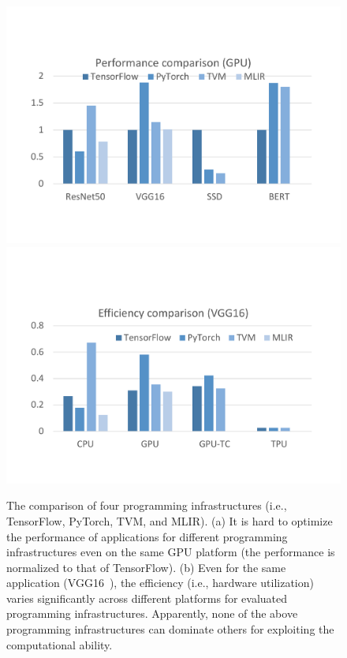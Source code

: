 \documentclass[pageno]{jpaper}
\begin{document}
\begin{figure}[t]

\centering
  \includegraphics[width=0.44\columnwidth]{figures/intro-perf-gpu.pdf}
  \includegraphics[width=0.44\columnwidth]{figures/intro-eff.pdf}
\caption{\footnotesize The comparison of four programming infrastructures (i.e., TensorFlow, PyTorch, TVM, and MLIR). (a) It is hard to optimize the performance of applications for different programming infrastructures even on the same GPU platform (the performance is normalized to that of TensorFlow). (b) Even for the same application (VGG16~\cite{simonyan2014very}), the efficiency (i.e., hardware utilization) varies significantly across different platforms for evaluated programming infrastructures. Apparently, none of the above programming infrastructures can dominate others for exploiting the computational ability.}
\label{fig:challenge}

\end{figure}
\end{document}
